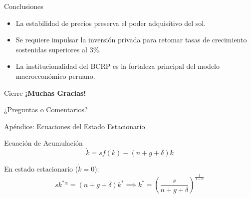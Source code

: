 \documentclass[10pt]{beamer}
\begin{document}
\begin{frame}{Conclusiones}
  \begin{itemize}[<+->]
    \item La estabilidad de precios preserva el poder adquisitivo del sol.
    \item Se requiere impulsar la inversión privada para retomar tasas de crecimiento sostenidas superiores al 3\%.
    \item La institucionalidad del BCRP es la fortaleza principal del modelo macroeconómico peruano.
  \end{itemize}
\end{frame}

\begin{frame}{Cierre}
  \centering
  \Large \textbf{¡Muchas Gracias!}

  \vspace{1cm}
  \normalsize ¿Preguntas o Comentarios?
\end{frame}

\begin{frame}[label=slide_apendice]{Apéndice: Ecuaciones del Estado Estacionario}
  \begin{block}{Ecuación de Acumulación}
    $$\dot{k} = s f(k) - (n + g + \delta)k$$
  \end{block}

  En estado estacionario ($\dot{k} = 0$):
  $$s k^*{}^\alpha = (n + g + \delta)k^* \implies k^* = \left( \frac{s}{n + g + \delta} \right)^{\frac{1}{1-\alpha}}$$

  \vspace{0.5cm}
  \centering
  \hyperlink{slide_monetaria}{}
\end{frame}
\end{document}
